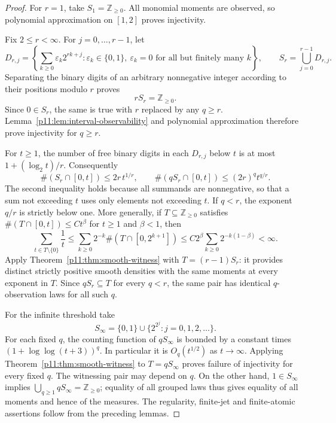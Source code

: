 \documentclass[11pt,letterpaper]{article}
\theoremstyle{definition}
\theoremstyle{remark}
\newcommand{\1}{\mathbf 1}
\begin{document}
\begin{proof}
For $r=1$, take $S_1=\mathbb Z_{\geq0}$.  All monomial moments are
observed, so polynomial approximation on $[1,2]$ proves injectivity.

Fix $2\leq r<\infty$.  For $j=0,\ldots,r-1$, let
\[
 D_{r,j}=\left\{\sum_{k\geq0}\varepsilon_k2^{rk+j}:
       \varepsilon_k\in\{0,1\},\ \varepsilon_k=0
       \text{ for all but finitely many }k\right\},\qquad
 S_r=\bigcup_{j=0}^{r-1}D_{r,j}.
\]
Separating the binary digits of an arbitrary nonnegative integer
according to their positions modulo $r$ proves
\begin{equation}\label{p11:eq:digit-basis}
 rS_r=\mathbb Z_{\geq0}.
\end{equation}
Since $0\in S_r$, the same is true with $r$ replaced by any $q\geq r$.
Lemma~\ref{p11:lem:interval-observability} and polynomial approximation
therefore prove injectivity for $q\geq r$.

For $t\geq1$, the number of free binary digits in each $D_{r,j}$
below $t$ is at most $1+(\log_2t)/r$.  Consequently
\[
 \#(S_r\cap[0,t])\leq 2r\,t^{1/r},\qquad
 \#(qS_r\cap[0,t])\leq(2r)^q t^{q/r}.
\]
The second inequality holds because all summands are nonnegative,
so that a sum not exceeding $t$ uses only elements not exceeding
$t$.  If $q<r$, the exponent $q/r$ is strictly below one.  More generally,
if $T\subseteq\mathbb Z_{\geq0}$ satisfies
$\#(T\cap[0,t])\leq C t^\beta$ for $t\geq1$ and $\beta<1$, then
\[
 \sum_{t\in T\setminus\{0\}}\frac1t
 \leq\sum_{k\geq0}2^{-k}\#(T\cap[0,2^{k+1}])
 \leq C2^\beta\sum_{k\geq0}2^{-k(1-\beta)}<\infty.
\]
Apply
Theorem~\ref{p11:thm:smooth-witness} with $T=(r-1)S_r$: it provides
distinct strictly positive smooth densities with the same moments
at every exponent in $T$.  Since $qS_r\subseteq T$ for every $q<r$,
the same pair has identical $q$-observation laws for all such $q$.

For the infinite threshold take
\[
 S_\infty=\{0,1\}\cup\{2^{2^j}:j=0,1,2,\ldots\}.
\]
For each fixed $q$, the counting function of $qS_\infty$ is bounded
by a constant times $(1+\log\log(t+3))^q$.  In particular it is
$O_q(t^{1/2})$ as $t\longrightarrow\infty$.  Applying
Theorem~\ref{p11:thm:smooth-witness} to $T=qS_\infty$ proves failure of
injectivity for every fixed $q$.  The witnessing pair may depend
on $q$.  On the other hand, $1\in S_\infty$ implies
$\bigcup_{q\geq1}qS_\infty=\mathbb Z_{\geq0}$; equality of all grouped
laws thus gives equality of all moments and hence of the measures.
The regularity, finite-jet and finite-atomic assertions follow from
the preceding lemmas.
\end{proof}
\end{document}
